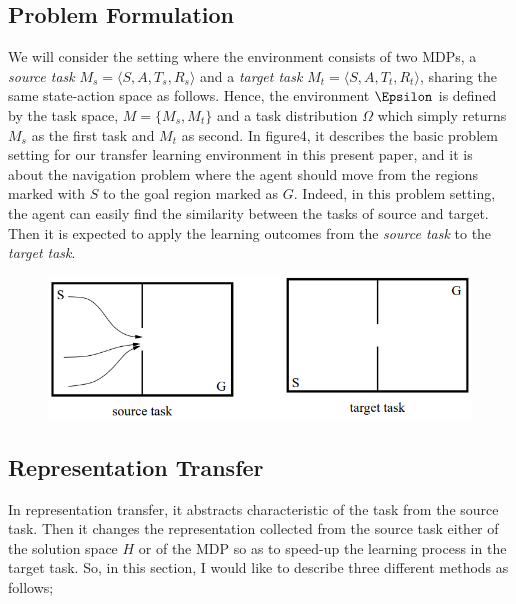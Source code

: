 \documentclass{article}
\begin{document}
\subsection{Problem Formulation}
We will consider the setting where the environment consists of two MDPs, a \textit{source task} $M_s = \langle S, A, T_s, R_s \rangle$ and a \textit{target task} $M_t = \langle S, A, T_t, R_t \rangle$, sharing the same state-action space as follows. Hence, the environment $\Epsilon$ is defined by the task space, $M = \{ M_s, M_t \}$ and a task distribution $\Omega$ which simply returns $M_s$ as the first task and $M_t$ as second. In figure4, it describes the basic problem setting for our transfer learning environment in this present paper, and it is about the navigation problem where the agent should move from the regions marked with $S$ to the goal region marked as $G$. Indeed, in this problem setting, the agent can easily find the similarity between the tasks of source and target. Then it is expected to apply the learning outcomes from the \textit{source task} to the \textit{target task}. 

\begin{figure}[h]
\includegraphics[width=\textwidth]{fig4}
\centering
\end{figure}

\subsection{Representation Transfer}
In representation transfer, it abstracts characteristic of the task from the source task. Then it changes the representation collected from the source task either of the solution space $H$ or of the MDP so as to speed-up the learning process in the target task. So, in this section, I would like to describe three different methods as follows;
\end{document}

